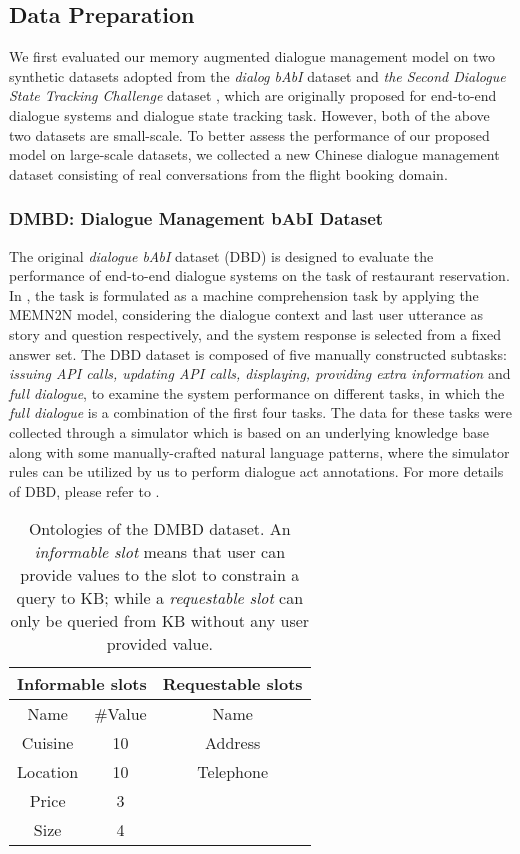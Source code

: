 \subsection{Data Preparation}
We first evaluated our memory augmented dialogue management model on two synthetic datasets adopted from the \emph{dialog bAbI} dataset\cite{bordes2016learning} and \emph{the Second Dialogue State Tracking Challenge} dataset \cite{henderson2014second}, which are originally proposed for end-to-end dialogue systems and dialogue state tracking task. However, both of the above two datasets are small-scale. To better assess the performance of our proposed model on large-scale datasets, we collected a new Chinese dialogue management dataset consisting of real conversations from the flight booking domain.

\subsubsection{DMBD: Dialogue Management bAbI Dataset}
The original {\em dialogue bAbI} dataset (DBD) is designed to evaluate the performance of end-to-end dialogue systems on the task of restaurant reservation. In \cite{bordes2016learning}, the task is formulated as a machine comprehension task by applying the MEMN2N \cite{sukhbaatar2015end} model, considering the dialogue context and last user utterance as story and question respectively, and the system response is selected from a fixed answer set. The DBD dataset is composed of five manually constructed subtasks: {\em issuing API calls, updating API calls, displaying, providing extra information} and {\em full dialogue}, to examine the system performance on different tasks, in which the {\em full dialogue} is a combination of the first four tasks. The data for these tasks were collected through a simulator which is based on an underlying knowledge base along with some manually-crafted natural language patterns, where the simulator rules can be utilized by us to perform dialogue act annotations. For more details of DBD, please refer to \cite{bordes2016learning}. 


\begin{table}[htbp]
\begin{center}
\begin{tabular}{| c | c | c |}
  \hline
    \multicolumn{2}{|c|}{\bf Informable slots} & \multicolumn{1}{c|}{\bf Requestable slots}\\
  \hline
    Name & \#Value & Name\\
  \hline
    Cuisine & 10 & Address\\
    Location & 10 & Telephone\\
    Price & 3 &\\
    Size & 4 & \\
  \hline
\end{tabular}
\end{center}
\caption{\label{tab:babi-ontology}Ontologies of the DMBD dataset. An {\em informable slot} means that user can provide values to the slot to constrain a query to KB; while a {\em requestable slot} can only be queried from KB without any user provided value.}
\end{table}


